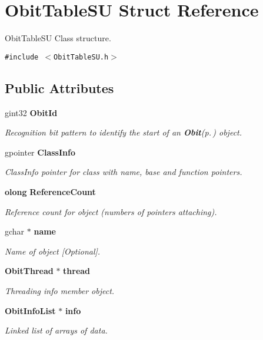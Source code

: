 \section{Obit\-Table\-SU Struct Reference}
\label{structObitTableSU}
Obit\-Table\-SU Class structure.  


{\tt \#include $<$Obit\-Table\-SU.h$>$}

\subsection*{Public Attributes}
\begin{CompactItemize}
\item 
gint32 {\bf Obit\-Id}
\begin{CompactList}\small\item\em Recognition bit pattern to identify the start of an {\bf Obit}{\rm (p.\,\pageref{structObit})} object. \item\end{CompactList}\item 
gpointer {\bf Class\-Info}
\begin{CompactList}\small\item\em Class\-Info pointer for class with name, base and function pointers. \item\end{CompactList}\item 
{\bf olong} {\bf Reference\-Count}
\begin{CompactList}\small\item\em Reference count for object (numbers of pointers attaching). \item\end{CompactList}\item 
gchar $\ast$ {\bf name}
\begin{CompactList}\small\item\em Name of object [Optional]. \item\end{CompactList}\item 
{\bf Obit\-Thread} $\ast$ {\bf thread}
\begin{CompactList}\small\item\em Threading info member object. \item\end{CompactList}\item 
{\bf Obit\-Info\-List} $\ast$ {\bf info}
\begin{CompactList}\small\item\em Linked list of arrays of data. \item\end{CompactList}\item 

\end{CompactItemize}
